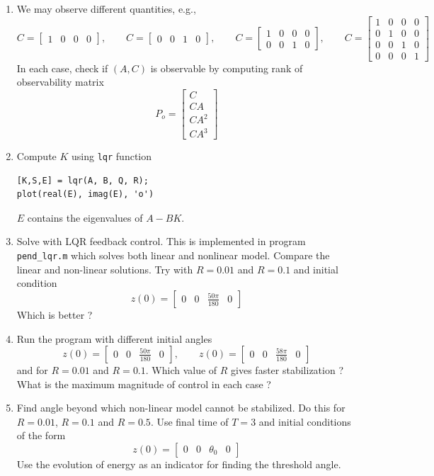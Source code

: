 \documentclass[12pt]{article}
\begin{document}
\begin{enumerate}

\item We may observe different quantities, e.g.,
\[
C = \begin{bmatrix}
1 & 0 & 0 & 0 
\end{bmatrix}, \qquad C = \begin{bmatrix}
0 & 0 & 1 & 0
\end{bmatrix}, \qquad C = \begin{bmatrix}
1 & 0 & 0 & 0 \\
0 & 0 & 1 & 0
\end{bmatrix}, \qquad C = \begin{bmatrix}
1 & 0 & 0 & 0 \\
0 & 1 & 0 & 0 \\
0 & 0 & 1 & 0 \\
0 & 0 & 0 & 1
\end{bmatrix}
\]
In each case, check if $(A,C)$ is observable by computing rank of observability matrix
\[
P_o = \begin{bmatrix}
C \\
CA \\
CA^2 \\
CA^3
\end{bmatrix}
\]

\item Compute $K$ using {\tt lqr} function
\begin{lstlisting}
[K,S,E] = lqr(A, B, Q, R);
plot(real(E), imag(E), 'o')
\end{lstlisting}
$E$ contains the eigenvalues of $A - B K$.

\item Solve with LQR feedback control. This is implemented in program {\tt pend\_lqr.m} which solves both linear and nonlinear model. Compare the linear and non-linear solutions. Try with $R=0.01$ and $R=0.1$ and initial condition
\[
z(0) = \begin{bmatrix}
0 & 0 & \frac{50 \pi}{180} & 0 
\end{bmatrix}
\]
Which is better ?

\item Run the program with different initial angles
\[
z(0) = \begin{bmatrix}
0 & 0 & \frac{50 \pi}{180} & 0 
\end{bmatrix}, \qquad z(0) = \begin{bmatrix}
0 & 0 & \frac{58 \pi}{180} & 0 
\end{bmatrix}
\]
and for $R=0.01$ and $R=0.1$. Which value of $R$ gives faster stabilization ? What is the maximum magnitude of control in each case ? 

\item Find angle beyond which non-linear model cannot be stabilized. Do this for $R=0.01$, $R=0.1$ and $R=0.5$. Use final time of $T=3$ and initial conditions of the form 
\[
z(0) = \begin{bmatrix}
0 & 0 & \theta_0 & 0 
\end{bmatrix}
\]
Use the evolution of energy as an indicator for finding the threshold angle.

\end{enumerate}
\end{document}
